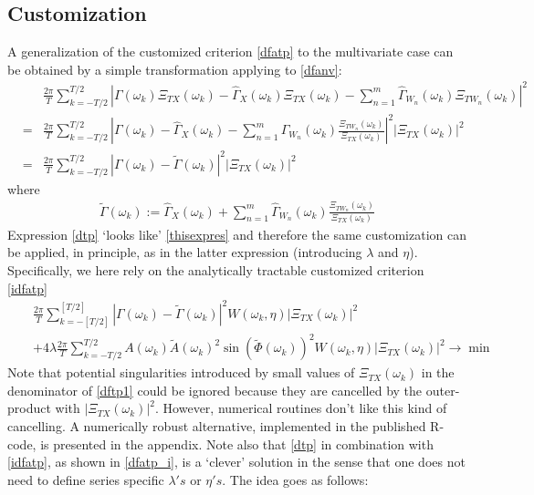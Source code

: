 \documentclass[11pt]{article}
\begin{document}
\subsection{Customization}\label{seccust}

A generalization of the customized criterion \ref{dfatp} to the multivariate case can  be obtained by a simple transformation applying to \ref{dfanv}:
\begin{eqnarray}
\label{dfavtp}
&&\frac{2\pi}{T} \sum_{k=-T/2}^{T/2}
\left|\Gamma(\omega_k)\Xi_{TX}(\omega_k)-\hat{\Gamma}_X(\omega_k)\Xi_{TX}(\omega_k)-\sum_{n=1}^m\hat{\Gamma}_{W_n}(\omega_k)\Xi_{TW_n}(\omega_k)\right|^2 \nonumber \\
&=&\frac{2\pi}{T} \sum_{k=-T/2}^{T/2}
\left|\Gamma(\omega_k)-\hat{\Gamma}_X(\omega_k)-\sum_{n=1}^m\hat{\Gamma}_{W_n}(\omega_k)\frac{\Xi_{TW_n}(\omega_k)}{\Xi_{TX}(\omega_k)}\right|^2 \left|\Xi_{TX}(\omega_k)\right|^2 \nonumber\\
&=&\frac{2\pi}{T} \sum_{k=-T/2}^{T/2}
\left|\Gamma(\omega_k)-\tilde{\Gamma}(\omega_k)\right|^2 \left|\Xi_{TX}(\omega_k)\right|^2\label{dtp}
\end{eqnarray}
where
\begin{eqnarray}\label{dftp1}
\tilde{\Gamma}(\omega_k):=\hat{\Gamma}_X(\omega_k)+\sum_{n=1}^m\hat{\Gamma}_{W_n}(\omega_k)\frac{\Xi_{TW_n}(\omega_k)}{\Xi_{TX}(\omega_k)}
\end{eqnarray}
Expression \ref{dtp} `looks like' \ref{thisexpres} and therefore the same customization can be applied, in principle, as in the latter expression (introducing $\lambda$ and $\eta$). Specifically, we here rely on the analytically tractable customized criterion \ref{idfatp}
\begin{eqnarray}
&&\frac{2\pi}{T} \sum_{k=-[T/2]}^{[T/2]}
|\Gamma(\omega_k)-\tilde{\Gamma}(\omega_k)|^2 W(\omega_k,\eta)\left|\Xi_{TX}(\omega_k)\right|^2\nonumber\\
&&+4\lambda\frac{2\pi}{ T} \sum_{k=-T/2}^{T/2}
A(\omega_k)\tilde{A}(\omega_k)^2\sin(\tilde{\Phi}(\omega_k))^2
W(\omega_k,\eta)\left|\Xi_{TX}(\omega_k)\right|^2\to\min\label{dfatp_i}
\end{eqnarray}
Note that potential singularities introduced by small values of $\Xi_{TX}(\omega_k)$ in the denominator of \ref{dftp1} could be ignored because they are cancelled by the outer-product with $|\Xi_{TX}(\omega_k)|^2$. However, numerical routines don't like this kind of cancelling. A numerically robust alternative, implemented in the published R-code, is presented in the appendix. Note also that \ref{dtp} in combination with \ref{idfatp}, as shown in \ref{dfatp_i}, is a `clever' solution in the sense that one does not need to define series specific $\lambda's$ or $\eta's$. The idea goes as follows:
\end{document}
